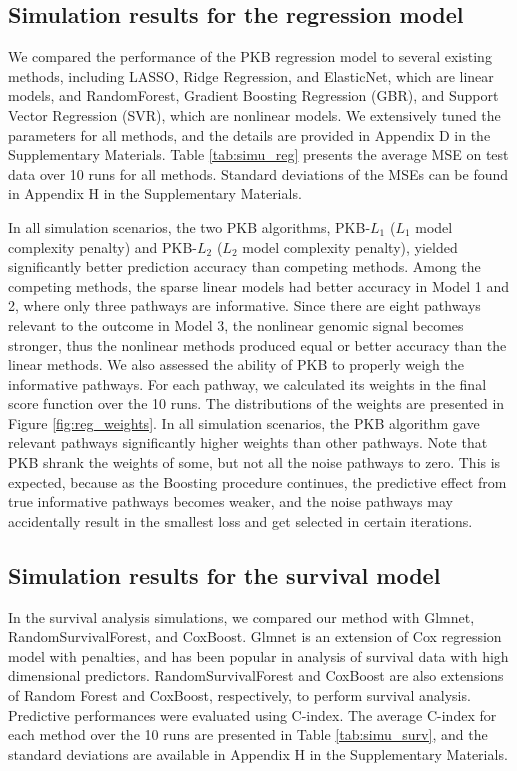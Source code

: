\documentclass[a4paper,12pt]{article}
\begin{document}
\subsection{Simulation results for the regression model}
We compared the performance of the PKB regression model to several existing methods, including LASSO,\cite{tibshirani1996regression} Ridge Regression,\cite{hoerl1970ridge} and ElasticNet, \citep{zou2005regularization} which are linear models, and RandomForest,\citep{breiman2001random} Gradient Boosting Regression (GBR), \citep{friedman2001greedy} and Support Vector Regression (SVR),\citep{smola2004tutorial} which are nonlinear models. We extensively tuned the parameters for all methods, and the details are provided in Appendix D in the Supplementary Materials. Table \ref{tab:simu_reg} presents the average MSE on test data over 10 runs for all methods. Standard deviations of the MSEs can be found in Appendix H in the Supplementary Materials.

In all simulation scenarios, the two PKB algorithms, PKB-$L_1$ ($L_1$ model complexity penalty) and PKB-$L_2$ ($L_2$ model complexity penalty), yielded significantly better prediction accuracy than competing methods. Among the competing methods, the sparse linear models had better accuracy in Model 1 and 2, where only three pathways are informative. Since there are eight pathways relevant to the outcome in Model 3, the nonlinear genomic signal becomes stronger, thus the nonlinear methods produced equal or better accuracy than the linear methods. We also assessed the ability of PKB to properly weigh the informative pathways. For each pathway, we calculated its weights in the final score function over the 10 runs. The distributions of the weights are presented in Figure \ref{fig:reg_weights}. In all simulation scenarios, the PKB algorithm gave relevant pathways significantly higher weights than other pathways. Note that PKB shrank the weights of some, but not all the noise pathways to zero. This is expected, because as the Boosting procedure continues, the predictive effect from true informative pathways becomes weaker, and the noise pathways may accidentally result in the smallest loss and get selected in certain iterations.

\subsection{Simulation results for the survival model}
In the survival analysis simulations, we compared our method with Glmnet,\citep{simon2011regularization} RandomSurvivalForest, \citep{ishwaran2008random} and CoxBoost. \citep{binder2013coxboost} Glmnet is an extension of Cox regression model with penalties, and has been popular in analysis of survival data with high dimensional predictors. RandomSurvivalForest and CoxBoost are also extensions of Random Forest and CoxBoost, respectively,  to perform survival analysis. Predictive performances were evaluated using C-index. The average C-index for each method over the 10 runs are presented in Table \ref{tab:simu_surv}, and the standard deviations are available in Appendix H in the Supplementary Materials. 
\end{document}
